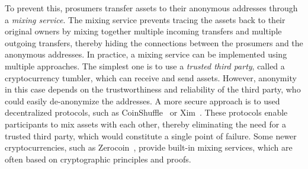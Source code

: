 To prevent this, prosumers transfer assets to their anonymous addresses through a \emph{mixing service}. 
The mixing service prevents tracing the assets back to their original owners by mixing together multiple incoming transfers and multiple outgoing transfers, thereby hiding the connections between the prosumers and the anonymous addresses.
In practice, a mixing service can be implemented using multiple approaches.
The simplest one is to use a \emph{trusted third party}, called a cryptocurrency tumbler, which can receive and send assets.
However, anonymity in this case depends on the trustworthiness and reliability of the third party, who could easily de-anonymize the addresses.
A more secure approach is to used decentralized protocols, such as CoinShuffle~\cite{ruffing2014coinshuffle} or Xim~\cite{bissias2014sybil}.
These protocols enable participants to mix assets with each other, thereby eliminating the need for a trusted third party, which would constitute a single point of failure.
Some newer cryptocurrencies, such as Zerocoin~\cite{miers2013zerocoin},  provide built-in mixing services, which are often based on cryptographic principles and proofs.

